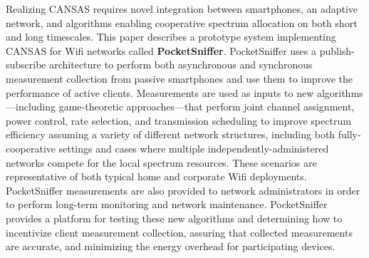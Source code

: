 Realizing CANSAS requires novel integration between smartphones, an adaptive
network, and algorithms enabling cooperative spectrum allocation on both
short and long timescales. This paper describes a prototype system
implementing CANSAS for Wifi networks called \textbf{PocketSniffer}.
PocketSniffer uses a publish-subscribe architecture to perform both
asynchronous and synchronous measurement collection from passive smartphones
and use them to improve the performance of active clients. Measurements are
used as inputs to new algorithms---including game-theoretic approaches---that
perform joint channel assignment, power control, rate selection, and
transmission scheduling to improve spectrum efficiency assuming a variety of
different network structures, including both fully-cooperative settings and
cases where multiple independently-administered networks compete for the
local spectrum resources. These scenarios are representative of both typical
home and corporate Wifi deployments. PocketSniffer measurements are also
provided to network administrators in order to perform long-term monitoring
and network maintenance. PocketSniffer provides a platform for testing these
new algorithms and determining how to incentivize client measurement
collection, assuring that collected measurements are accurate, and minimizing
the energy overhead for participating devices.
